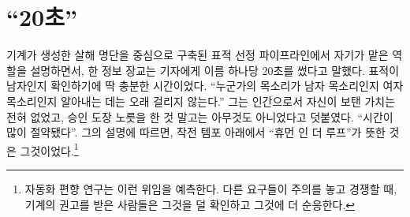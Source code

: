 \chapter{“20초”}
\label{sec:1}
기계가 생성한 살해 명단을 중심으로 구축된 표적 선정 파이프라인에서 자기가 맡은 역할을 설명하면서, 한 정보 장교는 기자에게 이름 하나당 20초를 썼다고 말했다. 표적이 남자인지 확인하기에 딱 충분한 시간이었다. “누군가의 목소리가 남자 목소리인지 여자 목소리인지 알아내는 데는 오래 걸리지 않는다.” 그는 인간으로서 자신이 보탠 가치는 전혀 없었고, 승인 도장 노릇을 한 것 말고는 아무것도 아니었다고 덧붙였다. “시간이 많이 절약됐다”\autocite{abraham2024lavender}. 그의 설명에 따르면, 작전 템포 아래에서 “휴먼 인 더 루프”가 뜻한 것은 그것이었다.\footnote{자동화 편향 연구는 이런 위임을 예측한다. 다른 요구들이 주의를 놓고 경쟁할 때, 기계의 권고를 받은 사람들은 그것을 덜 확인하고 그것에 더 순응한다\autocite{parasuraman2010complacency}.}

